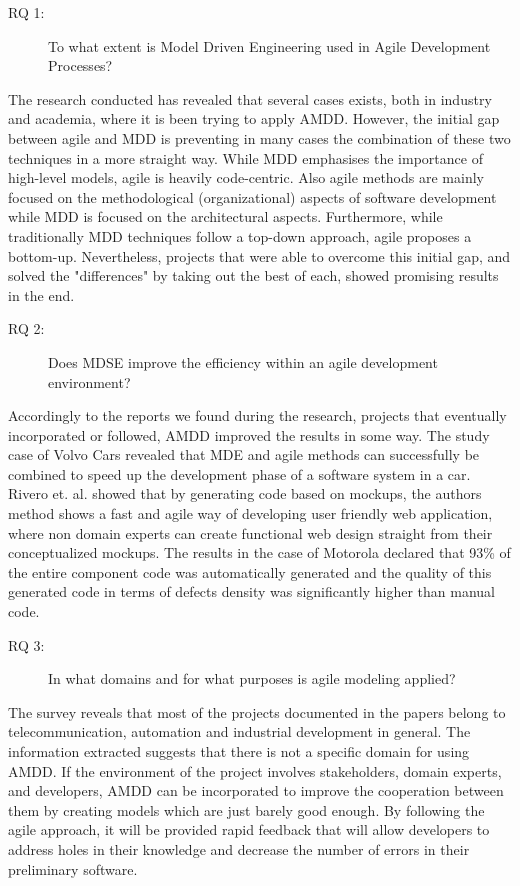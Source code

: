 \documentclass[10pt, a4paper, twocolumn]{article}
\begin{document}
\begin{description}
	\item[RQ 1:] To what extent is Model Driven Engineering used in Agile Development Processes?
\end{description}
The research conducted has revealed that several cases exists, both in industry and academia, where it is been trying to apply AMDD.
However, the initial gap between agile and MDD is preventing in many cases the combination of these two techniques in a more straight way.
While MDD emphasises the importance of high-level models, agile is heavily code-centric.
Also agile methods are mainly focused on the methodological (organizational) aspects of software development while MDD is focused on the architectural aspects.
Furthermore, while traditionally MDD techniques follow a top-down approach, agile proposes a bottom-up.
Nevertheless, projects that were able to overcome this initial gap, and solved the "differences" by taking out the best of each, showed promising results in the end.


\begin{description}
	\item[RQ 2:] Does MDSE improve the efficiency within an agile development environment?
\end{description}

Accordingly to the reports we found during the research, projects that eventually incorporated or followed, AMDD improved the results in some way.
The study case of Volvo Cars revealed that MDE and agile methods can successfully be combined to speed up the development phase of a software system in a car\cite{Eliasson2014}.
Rivero et. al. \cite{RIVERO2014670} showed that by generating code based on mockups, the authors method shows a fast and agile way of developing user friendly web application, where non domain experts can create functional web design straight from their conceptualized mockups.
The results in the case of Motorola \cite{zhang2011agile} declared that 93\% of the entire component code was automatically generated and the quality of this generated code in terms of defects density was significantly higher than manual code.

\begin{description}
	\item[RQ 3:] In what domains and for what purposes is agile modeling applied?
\end{description}
The survey reveals that most of the projects documented in the papers belong to telecommunication, automation and industrial development in general.
The information extracted suggests that there is not a specific domain for using AMDD.
If the environment of the project involves stakeholders, domain experts, and developers, AMDD can be incorporated to improve the cooperation between them by creating models which are just barely good enough.
By following the agile approach, it will be provided rapid feedback that will allow developers to address holes in their knowledge and decrease the number of errors in their preliminary software.
\end{document}
